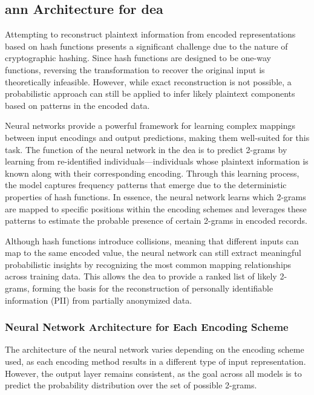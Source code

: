 \subsection{\ac{ann} Architecture for \ac{dea}} \label{sec:architecture}

Attempting to reconstruct plaintext information from encoded representations based on hash functions presents a significant challenge due to the nature of cryptographic hashing. Since hash functions are designed to be one-way functions, reversing the transformation to recover the original input is theoretically infeasible. However, while exact reconstruction is not possible, a probabilistic approach can still be applied to infer likely plaintext components based on patterns in the encoded data.

Neural networks provide a powerful framework for learning complex mappings between input encodings and output predictions, making them well-suited for this task. The function of the neural network in the \ac{dea} is to predict 2-grams by learning from re-identified individuals—individuals whose plaintext information is known along with their corresponding encoding. Through this learning process, the model captures frequency patterns that emerge due to the deterministic properties of hash functions. In essence, the neural network learns which 2-grams are mapped to specific positions within the encoding schemes and leverages these patterns to estimate the probable presence of certain 2-grams in encoded records.

Although hash functions introduce collisions, meaning that different inputs can map to the same encoded value, the neural network can still extract meaningful probabilistic insights by recognizing the most common mapping relationships across training data. This allows the \ac{dea} to provide a ranked list of likely 2-grams, forming the basis for the reconstruction of personally identifiable information (PII) from partially anonymized data.

\subsubsection{Neural Network Architecture for Each Encoding Scheme}

The architecture of the neural network varies depending on the encoding scheme used, as each encoding method results in a different type of input representation. However, the output layer remains consistent, as the goal across all models is to predict the probability distribution over the set of possible 2-grams.

